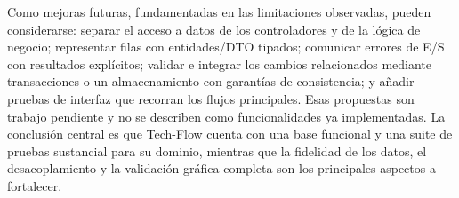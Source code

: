 Como mejoras futuras, fundamentadas en las limitaciones observadas, pueden considerarse: separar el acceso a datos de los controladores y de la lógica de negocio; representar filas con entidades/DTO tipados; comunicar errores de E/S con resultados explícitos; validar e integrar los cambios relacionados mediante transacciones o un almacenamiento con garantías de consistencia; y añadir pruebas de interfaz que recorran los flujos principales. Esas propuestas son trabajo pendiente y no se describen como funcionalidades ya implementadas. La conclusión central es que Tech-Flow cuenta con una base funcional y una suite de pruebas sustancial para su dominio, mientras que la fidelidad de los datos, el desacoplamiento y la validación gráfica completa son los principales aspectos a fortalecer.
